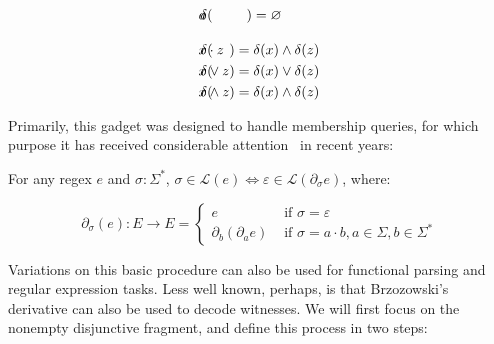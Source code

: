 \documentclass[sigplan,review,acmsmall,nonacm,screen,anonymous]{acmart}\settopmatter{printfolios=false,printccs=false,printacmref=false}
\begin{document}
\begin{definition}[Brzozowski, 1964]
\begin{multicols}{2}
\begin{eqnarray*}
      \delta(&\hspace{-0.35cm} a           \hspace{-0.35cm}&) = \varnothing\phantom{\begin{cases}\varepsilon\\\varnothing\end{cases}}\\
      \delta(&\hspace{-0.35cm} x\cdot z    \hspace{-0.35cm}&) = \delta(x) \land \delta(z)                        \\
      \delta(&\hspace{-0.35cm} x\vee  z    \hspace{-0.35cm}&) = \delta(x) \vee  \delta(z)                        \\
      \delta(&\hspace{-0.35cm} x\land z    \hspace{-0.35cm}&) = \delta(x) \land \delta(z)
    \end{eqnarray*}
  \end{multicols}
\end{definition}

Primarily, this gadget was designed to handle membership queries, for which purpose it has received considerable attention~\cite{might2011parsing,adams2016complexity,stanford2021symbolic,varatalu2025re} in recent years:

\begin{theorem}[Recognition]
  For any regex \(e\) and \(\sigma: \Sigma^*\), \(\sigma \in \mathcal{L}(e) \Longleftrightarrow \varepsilon \in \mathcal{L}(\partial_\sigma e)\), where:

  \[
    \partial_\sigma (e): E \rightarrow E = \begin{cases}e &\text{ if } \sigma = \varepsilon\\\partial_b(\partial_a e) &\text{ if } \sigma = a \cdot b, a \in \Sigma, b \in \Sigma^* \end{cases}
  \]
\end{theorem}

Variations on this basic procedure can also be used for functional parsing and regular expression tasks. Less well known, perhaps, is that Brzozowski's derivative can also be used to decode witnesses. We will first focus on the nonempty disjunctive fragment, and define this process in two steps:
\end{document}
